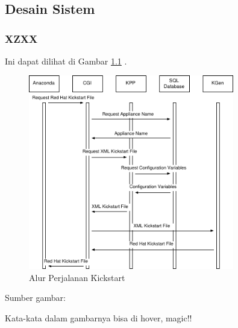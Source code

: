 \chapter{\babTiga}

\section{Desain Sistem}

\subsection{XZXX}
Ini dapat dilihat di Gambar \ref{fig:alurkickstart} \citep{paper.jackson}. 

\begin{figure}
	\centering
	\includegraphics[width=0.8\textwidth,height=0.7\textwidth]
		{pics/alurkickstart.pdf}
	\caption{Alur Perjalanan \f{Kickstart}}
	\label{fig:alurkickstart}
\end{figure}
\begin{center}
{\small Sumber gambar: \citep{paper.jackson}}
\end{center}

Kata-kata dalam gambarnya bisa di hover, magic!!

